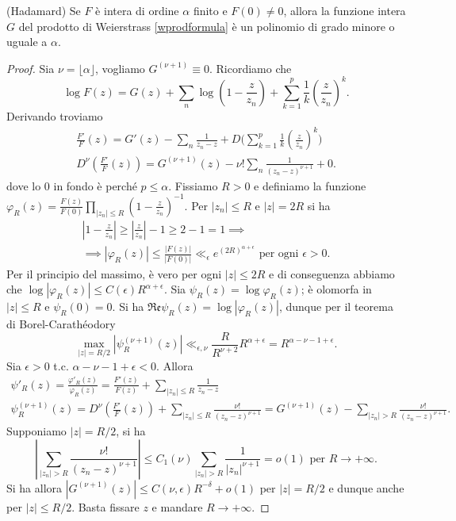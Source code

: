 \begin{thm} \label{hadamard}
  (Hadamard) Se $F$ è intera di ordine $\alpha$ finito e $F(0)\not=0$, allora la funzione intera $G$ del prodotto di Weierstrass \eqref{wprodformula} è un polinomio di grado minore o uguale a $\alpha$.
\end{thm}

\begin{proof}
  Sia $\nu=\lfloor\alpha\rfloor$, vogliamo $G^{(\nu+1)}\equiv 0$. Ricordiamo che
  $$\log{F(z)}=G(z)+\sum_n \log\left(1-\frac{z}{z_n}\right)+\sum_{k=1}^p \frac{1}{k}\left(\frac{z}{z_n}\right)^k.$$
  Derivando troviamo
  \begin{gather*}
    \frac{F'}{F}(z)=G'(z)-\sum_n \frac{1}{z_n-z}+D\Bigg(\sum_{k=1}^p \frac{1}{k}\left(\frac{z}{z_n}\right)^k\Bigg) \\
    D^{\nu}\left(\frac{F'}{F}(z)\right)=G^{(\nu+1)}(z)-\nu!\sum_n \frac{1}{(z_n-z)^{\nu+1}}+0.
  \end{gather*}
  dove lo $0$ in fondo è perché $p \le \alpha$. Fissiamo $R>0$ e definiamo la funzione $\displaystyle \varphi_R(z)=\frac{F(z)}{F(0)}\prod_{|z_n| \le R} \left(1-\frac{z}{z_n}\right)^{-1}$.
  Per $|z_n| \le R$ e $|z|=2R$ si ha
  \begin{gather*}
    \left|1-\frac{z}{z_n}\right| \ge \left|\frac{z}{z_n}\right|-1 \ge 2-1=1 \implies \\
    \implies |\varphi_R(z)| \le \frac{|F(z)|}{|F(0)|} \ll_{\epsilon} e^{(2R)^{\alpha+\epsilon}} \text{ per ogni } \epsilon>0.
  \end{gather*}
  Per il principio del massimo, è vero per ogni $|z| \le 2R$ e di conseguenza abbiamo che $\log{|\varphi_R(z)|} \le C(\epsilon)R^{\alpha+\epsilon}$. Sia $\psi_R(z)=\log{\varphi_R(z)}$; è olomorfa in $|z| \le R$ e $\psi_R(0)=0$. Si ha $\mathfrak{Re}\psi_R(z)=\log{|\varphi_R(z)|}$, dunque per il teorema di Borel-Carathéodory
  $$\max_{|z|=R/2}|\psi_R^{(\nu+1)}(z)| \ll_{\epsilon,\nu} \frac{R}{R^{\nu+2}}R^{\alpha+\epsilon}=R^{\alpha-\nu-1+\epsilon}.$$
  Sia $\epsilon>0$ t.c. $\alpha-\nu-1+\epsilon<0$. Allora
  \begin{gather*}
    \psi'_R(z)=\frac{\varphi'_R(z)}{\varphi_R(z)}=\frac{F'(z)}{F(z)}+\sum_{|z_n| \le R} \frac{1}{z_n-z} \\
    \psi_R^{(\nu+1)}(z)=D^{\nu}\left(\frac{F'}{F}(z)\right)+\sum_{|z_n| \le R} \frac{\nu!}{(z_n-z)^{\nu+1}}=G^{(\nu+1)}(z)-\sum_{|z_n|>R} \frac{\nu!}{(z_n-z)^{\nu+1}}.
  \end{gather*}
  Supponiamo $|z|=R/2$, si ha
  $$\left|\sum_{|z_n|>R} \frac{\nu!}{(z_n-z)^{\nu+1}}\right| \le C_1(\nu) \sum_{|z_n|>R} \frac{1}{|z_n|^{\nu+1}}=o(1) \text{ per } R \longrightarrow +\infty.$$
  Si ha allora $|G^{(\nu+1)}(z)| \le C(\nu,\epsilon)R^{-\delta}+o(1)$ per $|z|=R/2$ e dunque anche per $|z| \le R/2$. Basta fissare $z$ e mandare $R \longrightarrow +\infty$.
\end{proof}

